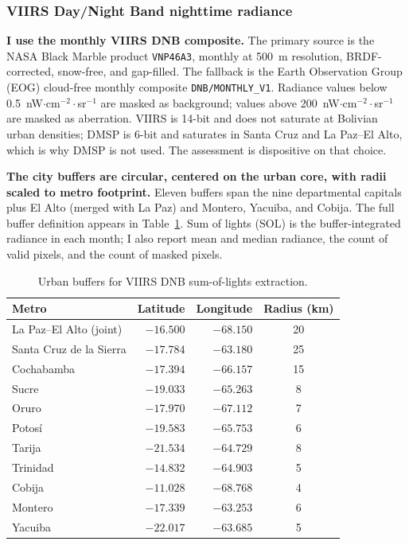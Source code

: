 \documentclass[11pt,letterpaper]{article}
\newcommand{\claim}[1]{\textbf{#1.}}
\begin{document}
\subsubsection{VIIRS Day/Night Band nighttime radiance}

\claim{I use the monthly VIIRS DNB composite} The primary source is the NASA Black Marble product \texttt{VNP46A3}, monthly at \num{500}~m resolution, BRDF-corrected, snow-free, and gap-filled. The fallback is the Earth Observation Group (EOG) cloud-free monthly composite \texttt{DNB/MONTHLY\_V1}. Radiance values below \num{0.5}~nW$\cdot$cm$^{-2}\cdot$sr$^{-1}$ are masked as background; values above \num{200}~nW$\cdot$cm$^{-2}\cdot$sr$^{-1}$ are masked as aberration. VIIRS is 14-bit and does not saturate at Bolivian urban densities; DMSP is 6-bit and saturates in Santa Cruz and La Paz--El Alto, which is why DMSP is not used. The \citet{gibson_etal2021} assessment is dispositive on that choice.

\claim{The city buffers are circular, centered on the urban core, with radii scaled to metro footprint} Eleven buffers span the nine departmental capitals plus El Alto (merged with La Paz) and Montero, Yacuiba, and Cobija. The full buffer definition appears in Table~\ref{tab:city_buffers}. Sum of lights (SOL) is the buffer-integrated radiance in each month; I also report mean and median radiance, the count of valid pixels, and the count of masked pixels.

\begin{table}[H]
\centering
\caption{Urban buffers for VIIRS DNB sum-of-lights extraction.}
\label{tab:city_buffers}
\small
\begin{tabular}{lrrc}
\toprule
Metro & Latitude & Longitude & Radius (km) \\
\midrule
La Paz--El Alto (joint) & $-16.500$ & $-68.150$ & \num{20} \\
Santa Cruz de la Sierra & $-17.784$ & $-63.180$ & \num{25} \\
Cochabamba & $-17.394$ & $-66.157$ & \num{15} \\
Sucre & $-19.033$ & $-65.263$ & \num{8} \\
Oruro & $-17.970$ & $-67.112$ & \num{7} \\
Potosí & $-19.583$ & $-65.753$ & \num{6} \\
Tarija & $-21.534$ & $-64.729$ & \num{8} \\
Trinidad & $-14.832$ & $-64.903$ & \num{5} \\
Cobija & $-11.028$ & $-68.768$ & \num{4} \\
Montero & $-17.339$ & $-63.253$ & \num{6} \\
Yacuiba & $-22.017$ & $-63.685$ & \num{5} \\
\bottomrule
\end{tabular}
\end{table}
\end{document}
